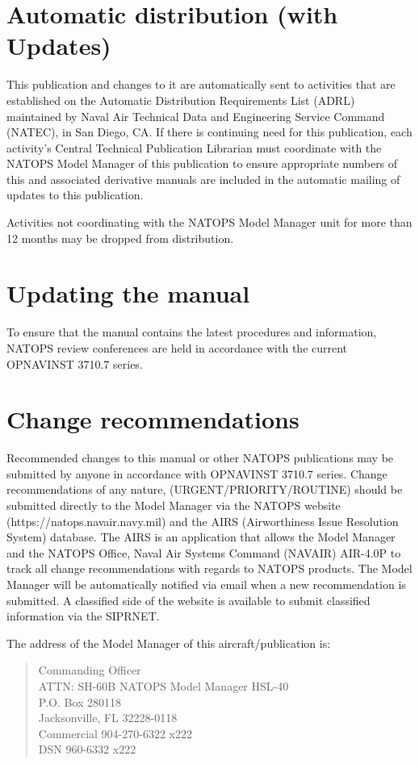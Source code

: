 \documentclass{book}
\begin{document}
\section*{Automatic distribution (with Updates)}
This publication and changes to it are automatically sent to activities that are established on the Automatic Distribution Requirements List (ADRL) maintained by Naval Air Technical Data and Engineering Service Command (NATEC), in San Diego, CA. If there is continuing need for this publication, each activity’s Central Technical Publication Librarian must coordinate with the NATOPS Model Manager of this publication to ensure appropriate numbers of this and associated derivative manuals are included in the automatic mailing of updates to this publication.
\begin{note}
Activities not coordinating with the NATOPS Model Manager unit for more than 12 months may be dropped from distribution.
\end{note}

\section*{Updating the manual}
To ensure that the manual contains the latest procedures and information, NATOPS review conferences are held in accordance with the current OPNAVINST 3710.7 series.

\section*{Change recommendations}
Recommended changes to this manual or other NATOPS publications may be submitted by anyone in accordance with OPNAVINST 3710.7 series.
Change recommendations of any nature, (URGENT/PRIORITY/ROUTINE) should be submitted directly to the Model Manager via the NATOPS website (https://natops.navair.navy.mil) and the AIRS (Airworthiness Issue Resolution System) database. The AIRS is an application that allows the Model Manager and the NATOPS Office, Naval Air Systems Command (NAVAIR) AIR-4.0P to track all change recommendations with regards to NATOPS products. The Model Manager will be automatically notified via email when a new recommendation is submitted. A classified side of the website is available to submit classified information via the SIPRNET.

The address of the Model Manager of this aircraft/publication is:
\begin{verse}
Commanding Officer\\
ATTN: SH-60B NATOPS Model Manager HSL-40\\
P.O. Box 280118\\
Jacksonville, FL 32228-0118\\
Commercial 904-270-6322 x222 \\
DSN 960-6332 x222\\
\end{verse}
\end{document}
